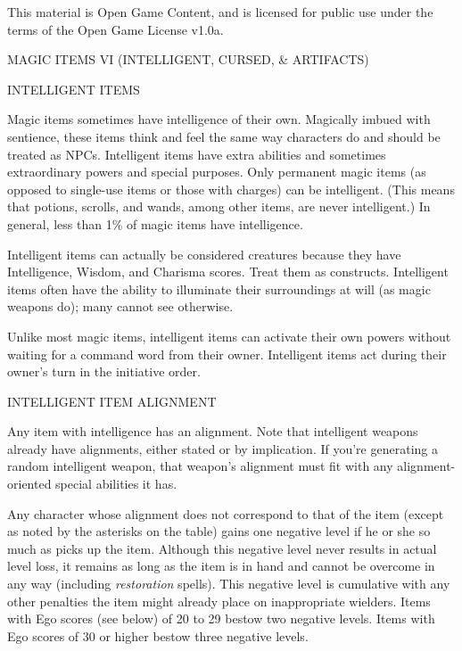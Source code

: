 \documentclass{article}
\begin{document}
This material is Open Game Content, and is licensed for public use under the terms 
of the Open Game License v1.0a.

{\LARGE{}MAGIC ITEMS VI (INTELLIGENT, CURSED, \& ARTIFACTS)}

\vspace{12pt}
{\LARGE{}INTELLIGENT ITEMS}

Magic items sometimes have intelligence of their own. Magically imbued with sentience, 
these items think and feel the same way characters do and should be treated as 
NPCs. Intelligent items have extra abilities and sometimes extraordinary powers 
and special purposes. Only permanent magic items (as opposed to single-use items 
or those with charges) can be intelligent. (This means that potions, scrolls, and 
wands, among other items, are never intelligent.) In general, less than 1\% of 
magic items have intelligence.

Intelligent items can actually be considered creatures because they have Intelligence, 
Wisdom, and Charisma scores. Treat them as constructs. Intelligent items often 
have the ability to illuminate their surroundings at will (as magic weapons do); 
many cannot see otherwise.

Unlike most magic items, intelligent items can activate their own powers without 
waiting for a command word from their owner. Intelligent items act during their 
owner's turn in the initiative order.

\vspace{12pt}
INTELLIGENT ITEM ALIGNMENT

Any item with intelligence has an alignment. Note that intelligent weapons already 
have alignments, either stated or by implication.  If you're generating a random 
intelligent weapon, that weapon's alignment must fit with any alignment-oriented 
special abilities it has.

Any character whose alignment does not correspond to that of the item (except as 
noted by the asterisks on the table) gains one negative level if he or she so much 
as picks up the item. Although this negative level never results in actual level 
loss, it remains as long as the item is in hand and cannot be overcome in any way 
(including \textit{restoration }spells). This negative level is cumulative with 
any other penalties the item might already place on inappropriate wielders. Items 
with Ego scores (see below) of 20 to 29 bestow two negative levels. Items with 
Ego scores of 30 or higher bestow three negative levels.
\end{document}
